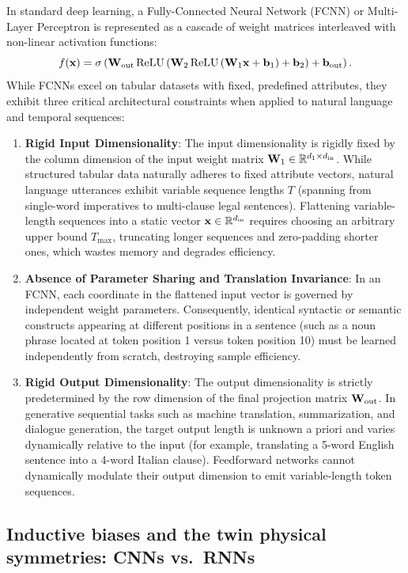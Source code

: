 \documentclass[../../main.tex]{subfiles}
\begin{document}
In standard deep learning, a Fully-Connected Neural Network (FCNN) or Multi-Layer Perceptron is represented as a cascade of weight matrices interleaved with non-linear activation functions:
\begin{equation}
\label{eq:fcnn_cascade}
f(\mathbf{x}) = \sigma\left( \mathbf{W}_{\text{out}} \operatorname{\mathrm{ReLU}}\left( \mathbf{W}_2 \operatorname{\mathrm{ReLU}}\left( \mathbf{W}_1 \mathbf{x} + \mathbf{b}_1 \right) + \mathbf{b}_2 \right) + \mathbf{b}_{\text{out}} \right).
\end{equation}
While FCNNs excel on tabular datasets with fixed, predefined attributes, they exhibit three critical architectural constraints when applied to natural language and temporal sequences:
\begin{enumerate}
    \item \textbf{Rigid Input Dimensionality}: The input dimensionality is rigidly fixed by the column dimension of the input weight matrix $\mathbf{W}_1 \in \mathbb{R}^{d_1 \times d_{\text{in}}}$. While structured tabular data naturally adheres to fixed attribute vectors, natural language utterances exhibit variable sequence lengths $T$ (spanning from single-word imperatives to multi-clause legal sentences). Flattening variable-length sequences into a static vector $\mathbf{x} \in \mathbb{R}^{d_{\text{in}}}$ requires choosing an arbitrary upper bound $T_{\max}$, truncating longer sequences and zero-padding shorter ones, which wastes memory and degrades efficiency.
    \item \textbf{Absence of Parameter Sharing and Translation Invariance}: In an FCNN, each coordinate in the flattened input vector is governed by independent weight parameters. Consequently, identical syntactic or semantic constructs appearing at different positions in a sentence (such as a noun phrase located at token position 1 versus token position 10) must be learned independently from scratch, destroying sample efficiency.
    \item \textbf{Rigid Output Dimensionality}: The output dimensionality is strictly predetermined by the row dimension of the final projection matrix $\mathbf{W}_{\text{out}}$. In generative sequential tasks such as machine translation, summarization, and dialogue generation, the target output length is unknown a priori and varies dynamically relative to the input (for example, translating a 5-word English sentence into a 4-word Italian clause). Feedforward networks cannot dynamically modulate their output dimension to emit variable-length token sequences.
\end{enumerate}

\subsection{Inductive biases and the twin physical symmetries: CNNs vs.~RNNs}
\label{subsec:inductive_biases_symmetries}
\end{document}

